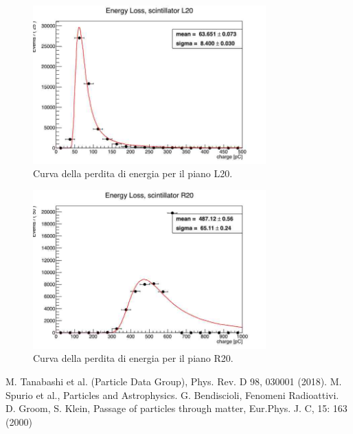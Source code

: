 \begin{figure}[H]
  \centering
  \includegraphics[width=0.8\textwidth]{plots/energy_L20.jpg}
  \caption{Curva della perdita di energia per il piano L20.}
  \label{fig:l20}
\end{figure}

\begin{figure}[H]
  \centering
  \includegraphics[width=0.8\textwidth]{plots/energy_R20.jpg}
  \caption{Curva della perdita di energia per il piano R20.}
  \label{fig:r20}
\end{figure}


\begin{thebibliography}{90}             %
\rhead[\fancyplain{}{\bfseries \leftmark}]{\fancyplain{}{\bfseries
\thepage}}
 M. Tanabashi et al. (Particle Data Group), Phys. Rev. D 98, 030001 (2018).
 M. Spurio et al., Particles and Astrophysics.
 G. Bendiscioli, Fenomeni Radioattivi.
 D. Groom, S. Klein, Passage of particles through matter, Eur.Phys. J. C, 15: 163 (2000)
\end{thebibliography}

